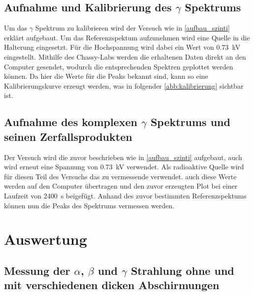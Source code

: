 \documentclass[12pt,english,ngerman]{scrartcl}
\begin{document}
\subsection{Aufnahme und Kalibrierung des \texorpdfstring{$\gamma$}{gamma} Spektrums}

Um das $\gamma$ Spektrum zu kalibrieren wird der Versuch wie in \autoref{aufbau_szinti} erklärt aufgebaut. Um das
Referenzspektum aufzunehmen wird eine  Quelle in die Halterung
eingesetzt. Für die Hochspannung wird dabei ein Wert von \SI{0.73}{\kilo\volt} eingestellt.
Mithilfe des Chassy-Labs werden die erhaltenen Daten direkt an den Computer gesendet, wodurch 
die entsprechenden Spektren geplottet werden können. Da hier die Werte für 
die Peaks bekannt sind, kann so eine Kalibrierungskurve erzeugt werden, was in folgender 
\autoref{abb:kalibrierung} sichtbar ist.



\subsection{Aufnahme des komplexen \texorpdfstring{$\gamma$}{gamma} Spektrums und seinen Zerfallsprodukten}

Der Versuch wird die zuvor beschrieben wie in \autoref{aufbau_szinti} aufgebaut, auch wird erneut eine 
Spannung von \SI{0.73}{\kilo\volt} verwendet. Als radioaktive Quelle wird für diesen Teil des Versuchs
das zu vermessende  verwendet. auch diese Werte werden auf den Computer übertragen und 
den zuvor erzeugten Plot bei einer Laufzeit von \SI{2400}{\second} beigefügt. Anhand des zuvor
bestimmten Referenzspektums können nun die Peaks des  Spektrums vermessen werden.





\section{Auswertung}\label{sec:Auswertung}

\subsection{Messung der \texorpdfstring{$\alpha$}{alpha}, \texorpdfstring{$\beta$}{beta} und \texorpdfstring{$\gamma$}{gamma} Strahlung ohne und mit verschiedenen dicken Abschirmungen}
\end{document}
